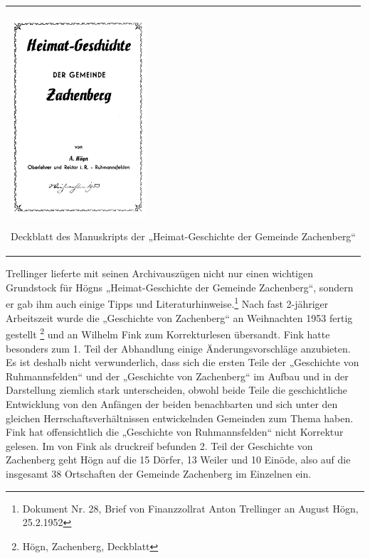\begin{center}
\begin{minipage}{5.378cm}
\begin{flushleft}
\tablefirsthead{}
\tablehead{}
\tabletail{}
\tablelasttail{}
\begin{supertabular}{m{5.178cm}}

\includegraphics[width=4.995cm,height=7.405cm]{pictures/zulassungsarbeit-img043.png}

Deckblatt des Manuskripts der
„Heimat-Geschichte der Gemeinde Zachenberg“\\
\end{supertabular}
\end{flushleft}
\end{minipage}
\end{center}
Trellinger lieferte mit seinen Archivauszügen nicht nur einen wichtigen
Grundstock für Högns „Heimat-Geschichte der Gemeinde Zachenberg“,
sondern er gab ihm auch einige Tipps und Literaturhinweise.\footnote{
Dokument Nr. 28, Brief von Finanzzollrat Anton Trellinger an August
Högn, 25.2.1952} Nach fast 2-jähriger Arbeitszeit wurde die „Geschichte
von Zachenberg“ an Weihnachten 1953 fertig gestellt \footnote{Högn,
Zachenberg, Deckblatt} und an Wilhelm Fink zum Korrekturlesen
übersandt. Fink hatte besonders zum 1. Teil der Abhandlung einige
Änderungsvorschläge anzubieten. Es ist deshalb nicht verwunderlich,
dass sich die ersten Teile der „Geschichte von Ruhmannsfelden“ und der
„Geschichte von Zachenberg“ im Aufbau und in der Darstellung ziemlich
stark unterscheiden, obwohl beide Teile die geschichtliche Entwicklung
von den Anfängen der beiden benachbarten und sich unter den gleichen
Herrschaftsverhältnissen entwickelnden Gemeinden zum Thema haben. Fink
hat offensichtlich die „Geschichte von Ruhmannsfelden“ nicht Korrektur
gelesen. Im von Fink als druckreif befunden 2. Teil der Geschichte von
Zachenberg geht Högn auf die 15 Dörfer, 13 Weiler und 10 Einöde, also
auf die insgesamt 38 Ortschaften der Gemeinde Zachenberg im Einzelnen
ein.

